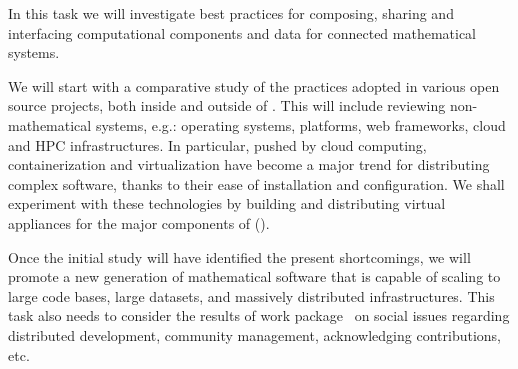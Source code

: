 \begin{workpackage}[id=component-architecture,wphases=0-48!.5,
  title=Component Architecture,lead=UV,
  PSRM=64,UVRM=8,SARM=16, USHRM=4, USORM=6, UBRM=12]
\begin{tasklist}
  \begin{task}[title=Modularization and packaging,id=mod-packaging,lead=UV,PM=32]




    In this task we will investigate best practices for composing,
    sharing and interfacing computational components and data for
    connected mathematical systems.

    We will start with a comparative study of the practices adopted in
    various open source projects, both inside and outside of
    \TheProject. This will include reviewing non-mathematical systems,
    e.g.: operating systems, platforms, web frameworks, cloud and HPC
    infrastructures.  In particular, pushed by cloud computing,
    containerization and virtualization have become a major trend for
    distributing complex software, thanks to their ease of
    installation and configuration. We shall experiment with these
    technologies by building and distributing virtual appliances for
    the major components of \TheProject
    ().

    Once the initial study will have identified the present
    shortcomings, we will promote a new generation of mathematical
    software that is capable of scaling to large code bases, large
    datasets, and massively distributed infrastructures. This task
    also needs to consider the results of work
    package~ on social issues regarding
    distributed development, community management, acknowledging
    contributions, etc.


\end{task}
\end{tasklist}
\end{workpackage}
